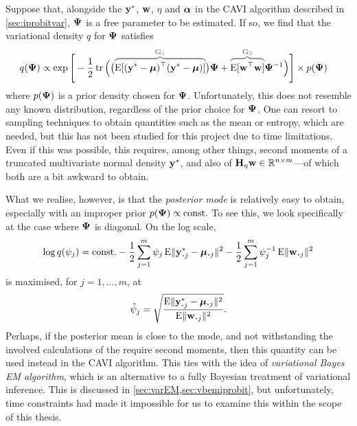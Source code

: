 Suppose that, alongside the ${\mathbf y}^*$, ${\mathbf w}$, $\eta$ and ${\bm\alpha}$ in the CAVI algorithm described in \cref{sec:iprobitvar}, ${\bm\Psi}$ is a free parameter to be estimated.
If so, we find that the variational density $q$ for ${\bm\Psi}$ satisfies
\begin{align*}
  q(\bPsi)
  &\propto \exp\Bigg[-\half \tr \Big(
  \big( %
  \greyoverbrace{\E[(\by^* - \bmu)^\top (\by^* - \bmu)]}{\bG_1}
  \big)\bPsi +
  \greyoverbrace{\E[\bw^\top\bw]}{\bG_2} \bPsi^{-1}
  \Big) \Bigg] \times p(\bPsi)
\end{align*}
where $p({\bm\Psi})$ is a prior density chosen for ${\bm\Psi}$.
Unfortunately, this does not resemble any known distribution, regardless of the prior choice for ${\bm\Psi}$.
One can resort to sampling techniques to obtain quantities such as the mean or entropy, which are needed, but this has not been studied for this project due to time limitations.
Even if this was possible, this requires, among other things, second moments of a truncated multivariate normal density ${\mathbf y}^*$, and also of ${\mathbf H}_\eta{\mathbf w} \in \mathbb{R}^{n\times m}$---of which both are a bit awkward to obtain.

What we realise, however, is that the \emph{posterior mode} is relatively easy to obtain, especially with an improper prior $p({\bm\Psi})\propto \text{const.}\hspace{0.01em}$ 
To see this, we look specifically at the case where ${\bm\Psi}$ is diagonal.
On the log scale,
\begin{align*}
  \log  q(\psi_j)
  &= \const - \half\sum_{j=1}^m \psi_j \E\norm{\by_{\bigcdot j}^* -  \bmu_{\bigcdot j}}^2 - \half\sum_{j=1}^m \psi_j^{-1} \E\norm{\bw_{\bigcdot j}}^2 \\
\end{align*}
is maximised, for $j=1,\dots,m$, at
\[
  \hat\psi_j = \sqrt{\frac{ \E\norm{\by_{\bigcdot j}^* -  \bmu_{\bigcdot j}}^2 }{\E\norm{\bw_{\bigcdot j}}^2}}.
\]
Perhaps, if the posterior mean is close to the mode, and not withstanding the involved calculations of the require second moments, then this quantity can be used instead in the CAVI algorithm.
This ties with the idea of \emph{variational Bayes EM algorithm}, which is an alternative to a fully Bayesian treatment of variational inference.
This is discussed in \cref{sec:varEM,sec:vbemiprobit}, but unfortunately, time constraints had made it impossible for us to examine this within the scope of this thesis.



